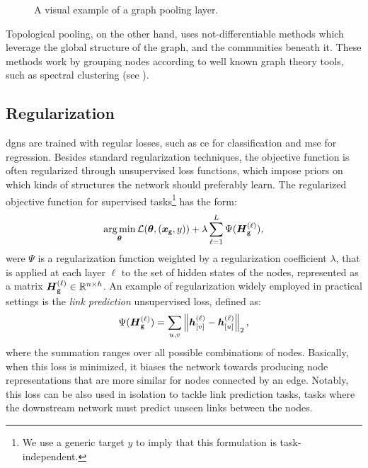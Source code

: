 \begin{figure}[h!]
    \centering
    \resizebox{.8\textwidth}{!}{}
    \caption{A visual example of a graph pooling layer.}
    \label{fig:pooling}
\end{figure}
Topological pooling, on the other hand,  uses not-differentiable methods which leverage the global structure of the graph, and the communities beneath it. These methods work by grouping nodes according to well known graph theory tools, such as spectral clustering (see \eg \citet{vonluxburg2007tutorialspectralclustering, dhillon2007weightedgraphcuts}).

\subsection{Regularization}
\glspl{dgn} are trained with regular losses, such as \gls{ce} for classification and \gls{mse} for regression. Besides standard regularization techniques, the objective function is often regularized through unsupervised loss functions, which impose priors on which kinds of
structures the network should preferably learn. The regularized objective function for supervised tasks\footnote{We use a generic target $y$ to imply that this formulation is task-independent.} has the form:
$$\argmin_{\Param} \Loss(\Param, (\Vector{x}_{\Graph{g}}, y)) + \lambda \sum_{\ell=1}^L \Psi(\LayerStateMat{g}{\ell}),$$
were $\Psi$ is a regularization function weighted by a regularization coefficient $\lambda$, that is applied at each layer $\ell$ to the set of hidden states of the nodes, represented as a matrix $\Matrix{h}_{{\Graph{g}}}^{(\ell)} \in \Real^{n \times h}$. An example of regularization widely employed in practical settings is the \emph{link prediction} unsupervised loss, defined as:
\begin{align}
    \Psi(\LayerStateMat{g}{\ell}) = \sum_{u,v} \Norm{\StateVector{v}{\ell} - \StateVector{u}{\ell}}_2,
\end{align}
where the summation ranges over all possible combinations of nodes. Basically, when this loss is minimized, it biases the network towards producing node representations that are more similar for nodes connected by an edge. Notably, this loss can be also used in isolation to tackle link prediction tasks, \ie tasks where the downstream network must predict unseen links between the nodes.

